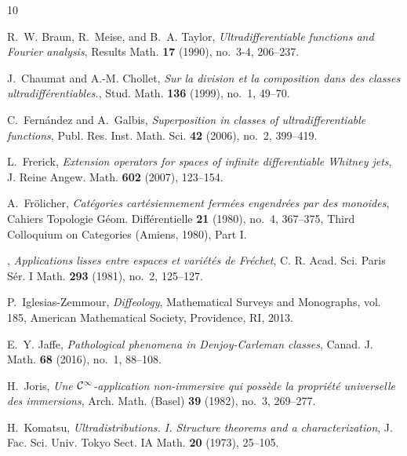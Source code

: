\documentclass[10pt, reqno]{amsart}
\theoremstyle{plain}
\theoremstyle{definition}
\numberwithin{equation}{section}
\begin{document}
\begin{thebibliography}{10}

    R.~W. Braun, R.~Meise, and B.~A. Taylor, \emph{Ultradifferentiable functions and {F}ourier analysis}, Results Math. \textbf{17} (1990), no.~3-4, 206--237.

    J.~{Chaumat} and A.-M. {Chollet}, \emph{{Sur la division et la composition dans des classes ultradiff\'erentiables.}}, {Stud. Math.} \textbf{136} (1999), no.~1, 49--70.

    C.~Fern{\'a}ndez and A.~Galbis, \emph{Superposition in classes of ultradifferentiable functions}, Publ. Res. Inst. Math. Sci. \textbf{42} (2006), no.~2, 399--419.

    L.~Frerick, \emph{Extension operators for spaces of infinite differentiable {W}hitney jets}, J. Reine Angew. Math. \textbf{602} (2007), 123--154. 

    A.~Fr\"olicher, \emph{Cat\'egories cart\'esiennement ferm\'ees engendr\'ees par des monoides}, Cahiers Topologie G\'eom. Diff\'erentielle \textbf{21} (1980), no.~4, 367--375, Third Colloquium on Categories (Amiens, 1980), Part I. 

    \bysame, \emph{Applications lisses entre espaces et vari\'et\'es de {F}r\'echet}, C. R. Acad. Sci. Paris S\'er. I Math. \textbf{293} (1981), no.~2, 125--127.

    P.~Iglesias-Zemmour, \emph{Diffeology}, Mathematical Surveys and Monographs, vol. 185, American Mathematical Society, Providence, RI, 2013. 

    E.~Y. Jaffe, \emph{Pathological phenomena in {D}enjoy-{C}arleman classes}, Canad. J. Math. \textbf{68} (2016), no.~1, 88--108. 

    H.~Joris, \emph{Une {${\mathcal C}\sp{\infty }$}-application non-immersive qui poss\`ede la propri\'et\'e universelle des immersions}, Arch. Math. (Basel) \textbf{39} (1982), no.~3, 269--277.

    H.~Komatsu, \emph{Ultradistributions. {I}. {S}tructure theorems and a characterization}, J. Fac. Sci. Univ. Tokyo Sect. IA Math. \textbf{20} (1973), 25--105.


\end{thebibliography}
\end{document}
